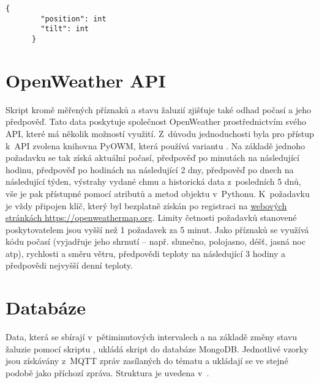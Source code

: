     \begin{lstlisting}[caption={[Struktura zprávy o~stavu žaluzie]Struktura zprávy o~stavu žaluzie, která je všem klientům zasílána každých 15~s. \code{position} označuje výšku vytažení žaluzie (0 -- zavřeno, 100 -- otevřeno), obdobně hodnota \code{tilt} vyjadřuje naklopení lamel.},captionpos=b,label=lst:wsMsg]
      {
        "position": int
        "tilt": int
      }
    \end{lstlisting}

  \section{OpenWeather API} \label{sec:owm}
    Skript  kromě měřených příznaků a stavu žaluzií zjišťuje také odhad počasí a jeho předpověď. Tato data poskytuje společnost OpenWeather prostřednictvím svého API, které má několik možností využití. Z~důvodu jednoduchosti byla pro přístup k~API zvolena knihovna PyOWM, která používá variantu . Na základě jednoho požadavku se tak získá aktuální počasí, předpověď po minutách na následující hodinu, předpověď po hodinách na následující 2 dny, předpověď po dnech na následující týden, výstrahy vydané \acrshort{chmu} a historická data z~posledních 5 dnů, vše je pak přístupné pomocí atributů a metod objektu v~Pythonu. K~požadavku je vždy připojen klíč, který byl bezplatně získán po registraci na \href{https://openweathermap.org}{webových stránkách https://openweathermap.org}. Limity četnosti požadavků stanovené poskytovatelem jsou vyšší než 1 požadavek za 5 minut. Jako příznaků se využívá kódu počasí (vyjadřuje jeho shrnutí -- např. slunečno, polojasno, déšť, jasná noc \acrshort{atp}), rychlosti a směru větru, předpovědi teploty na následující 3 hodiny a předpovědi nejvyšší denní teploty.

  \section{Databáze}\label{sec:db}
    Data, která se sbírají v~pětiminutových intervalech a na základě změny stavu žaluzie pomocí skriptu , ukládá skript  do databáze MongoDB. Jednotlivé vzorky jsou získávány z~MQTT zpráv zasílaných do tématu  a ukládají se ve stejné podobě jako příchozí zpráva. Struktura je uvedena v~.

